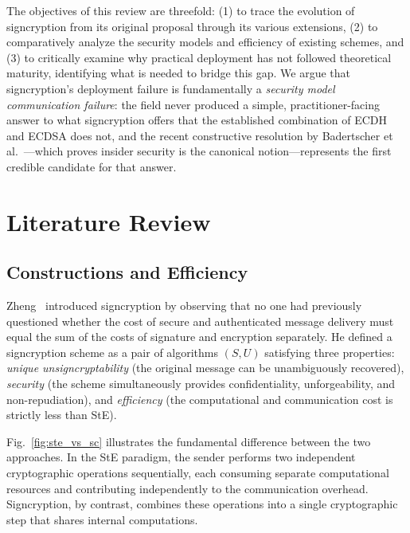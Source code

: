 \documentclass[conference]{IEEEtran}
\begin{document}
The objectives of this review are threefold: (1) to trace the evolution of signcryption from its original proposal through its various extensions, (2) to comparatively analyze the security models and efficiency of existing schemes, and (3) to critically examine why practical deployment has not followed theoretical maturity, identifying what is needed to bridge this gap. We argue that signcryption's deployment failure is fundamentally a \textit{security model communication failure}: the field never produced a simple, practitioner-facing answer to what signcryption offers that the established combination of ECDH and ECDSA does not, and the recent constructive resolution by Badertscher et al.~\cite{badertscher2018}---which proves insider security is the canonical notion---represents the first credible candidate for that answer.

\section{Literature Review}

\subsection{Constructions and Efficiency}

Zheng~\cite{zheng1997} introduced signcryption by observing that no one had previously questioned whether the cost of secure and authenticated message delivery must equal the sum of the costs of signature and encryption separately. He defined a signcryption scheme as a pair of algorithms $(S, U)$ satisfying three properties: \textit{unique unsigncryptability} (the original message can be unambiguously recovered), \textit{security} (the scheme simultaneously provides confidentiality, unforgeability, and non-repudiation), and \textit{efficiency} (the computational and communication cost is strictly less than StE).

Fig.~\ref{fig:ste_vs_sc} illustrates the fundamental difference between the two approaches. In the StE paradigm, the sender performs two independent cryptographic operations sequentially, each consuming separate computational resources and contributing independently to the communication overhead. Signcryption, by contrast, combines these operations into a single cryptographic step that shares internal computations.
\end{document}
